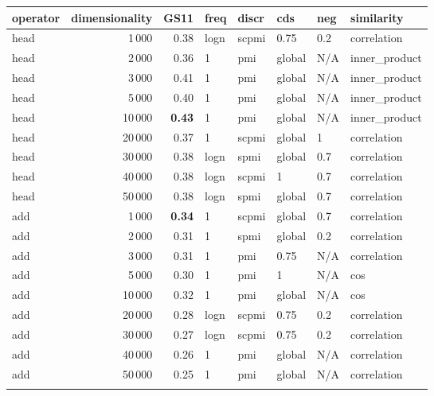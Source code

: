 \begin{tabular}{lrrlllll}
\toprule
operator &  dimensionality &  GS11 &  freq &  discr &     cds &  neg &     similarity \\
\midrule
    head &            1\,000 &  0.38 &  logn &  scpmi &    0.75 &  0.2 &    correlation \\
    head &            2\,000 &  0.36 &     1 &    pmi &  global &  N/A &  inner\_product \\
    head &            3\,000 &  0.41 &     1 &    pmi &  global &  N/A &  inner\_product \\
    head &            5\,000 &  0.40 &     1 &    pmi &  global &  N/A &  inner\_product \\
    head &           10\,000 &  \textbf{0.43} &     1 &    pmi &  global &  N/A &  inner\_product \\
    head &           20\,000 &  0.37 &     1 &  scpmi &  global &    1 &    correlation \\
    head &           30\,000 &  0.38 &  logn &   spmi &  global &  0.7 &    correlation \\
    head &           40\,000 &  0.38 &  logn &  scpmi &       1 &  0.7 &    correlation \\
    head &           50\,000 &  0.38 &  logn &   spmi &  global &  0.7 &    correlation \\ \addlinespace
     add &            1\,000 &  \textbf{0.34} &     1 &  scpmi &  global &  0.7 &    correlation \\
     add &            2\,000 &  0.31 &     1 &   spmi &  global &  0.2 &    correlation \\
     add &            3\,000 &  0.31 &     1 &    pmi &    0.75 &  N/A &    correlation \\
     add &            5\,000 &  0.30 &     1 &    pmi &       1 &  N/A &            cos \\
     add &           10\,000 &  0.32 &     1 &    pmi &  global &  N/A &            cos \\
     add &           20\,000 &  0.28 &  logn &  scpmi &    0.75 &  0.2 &    correlation \\
     add &           30\,000 &  0.27 &  logn &  scpmi &    0.75 &  0.2 &    correlation \\
     add &           40\,000 &  0.26 &     1 &    pmi &  global &  N/A &    correlation \\
     add &           50\,000 &  0.25 &     1 &    pmi &  global &  N/A &    correlation \\ \addlinespace

\end{tabular}
